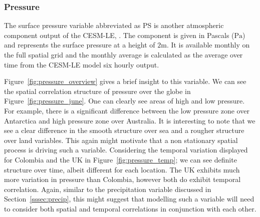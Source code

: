 \subsubsection{Pressure \label{sssec:pressure}}
The surface pressure variable abbreviated as PS is another atmospheric component output of the CESM-LE, \citep{kay_community_2015}.
The component is given in Pascals ($\si{\pascal}$) and represents the surface pressure at a height of $2\si{\meter}$. It is available monthly on the full spatial grid and the monthly average is calculated as the average over time from the CESM-LE model six hourly output.

Figure~\ref{fig:pressure_overview} gives a brief insight to this variable. 
We can see the spatial correlation structure of pressure over the globe in Figure~\ref{fig:pressure_june}.
One can clearly see areas of high and low pressure.
For example, there is a significant difference between the low pressure zone over Antarctica and high pressure zone over Australia. 
It is interesting to note that we see a clear difference in the smooth structure over sea and a rougher structure over land variables. 
This again might motivate that a non stationary spatial process is driving such a variable.
Considering the temporal variation displayed for Colombia and the UK in Figure~\ref{fig:pressure_temp}; we can see definite structure over time, albeit different for each location.
The UK exhibits much more variation in pressure than Colombia, however both do exhibit temporal correlation. 
Again, similar to the precipitation variable discussed in Section~\ref{sssec:precip}, this might suggest that modelling such a variable will need to consider both spatial and temporal correlations in conjunction with each other.

